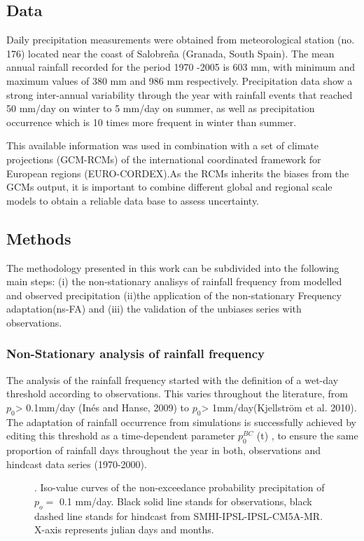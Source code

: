 \documentclass[a4paper,11pt]{article}
\begin{document}
\subsection{Data} 
Daily precipitation measurements were obtained from meteorological station (no. 176) located near the coast of Salobreña (Granada, South Spain). The mean annual rainfall recorded for the period 1970 -2005 is 603 mm, with minimum and maximum values of 380 mm and 986 mm respectively. Precipitation data show a strong inter-annual variability through the year with rainfall events that reached 50 mm/day on winter to 5 mm/day on summer, as well as precipitation occurrence which is 10 times more frequent in winter than summer.

This available information was used in combination with a set of climate projections (GCM-RCMs) of the international coordinated framework for European regions (EURO-CORDEX).As the RCMs inherits the biases from the GCMs output, it is important to combine different global and regional scale models to obtain a reliable data base to assess uncertainty.  


\subsection{Methods} 
The methodology presented in this work can be subdivided into the following main steps: (i) the non-stationary analisys of rainfall frequency from modelled and observed precipitation (ii)the application of the non-stationary Frequency adaptation(ns-FA) and (iii) the validation of the unbiases series with observations.

\subsubsection{Non-Stationary analysis of rainfall frequency} 
The analysis of the rainfall frequency started with the definition of a wet-day threshold according to observations. This varies throughout the literature, from $p_{0}$> 0.1mm/day (Inés and Hanse, 2009) to $p_{0}$> 1mm/day(Kjellström et al. 2010). 
The adaptation of rainfall occurrence from simulations is successfully achieved by editing this threshold as a time-dependent parameter $p_{0}^{BC}$ (t)  , to ensure the same proportion of rainfall days throughout the year in both, observations and hindcast data series (1970-2000). 


\begin{figure}[H]  %
\centering
\caption{. Iso-value curves of the non-exceedance probability precipitation of $p_{o}=$ 0.1 mm/day. Black solid line stands for observations, black dashed line stands for hindcast from SMHI-IPSL-IPSL-CM5A-MR. X-axis represents julian days and months. }
\label{F1}
\end{figure}
\end{document}
